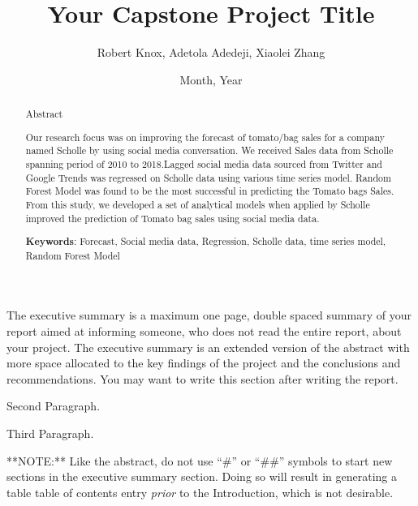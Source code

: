 \documentclass[12pt,oneside]{chicagocapstone}
\title{Your Capstone Project Title}
\author{Robert Knox, Adetola Adedeji, Xiaolei Zhang}
\date{Month, Year} %
\begin{document}
  \maketitle

\frontmatter %
\pagestyle{empty} %


  \begin{abstract}
    Abstract
    
    Our research focus was on improving the forecast of tomato/bag sales for
    a company named Scholle by using social media conversation. We received
    Sales data from Scholle spanning period of 2010 to 2018.Lagged social
    media data sourced from Twitter and Google Trends was regressed on
    Scholle data using various time series model. Random Forest Model was
    found to be the most successful in predicting the Tomato bags Sales.
    From this study, we developed a set of analytical models when applied by
    Scholle improved the prediction of Tomato bag sales using social media
    data.
    
    \bigskip  \bigskip
    \bigskip
    
    \textbf{Keywords}: Forecast, Social media data, Regression, Scholle
    data, time series model, Random Forest Model
    
    \bigskip  \bigskip
    \bigskip
  \end{abstract}
  \begin{executive}
    The executive summary is a maximum one page, double spaced summary of
    your report aimed at informing someone, who does not read the entire
    report, about your project. The executive summary is an extended version
    of the abstract with more space allocated to the key findings of the
    project and the conclusions and recommendations. You may want to write
    this section after writing the report.
    
    Second Paragraph.
    
    Third Paragraph.
    
    \bigskip
    \bigskip
    \bigskip
    **NOTE:** Like the abstract, do not use ``\#'' or ``\#\#'' symbols to
    start new sections in the executive summary section. Doing so will
    result in generating a table table of contents entry \emph{prior} to the
    Introduction, which is not desirable.
  \end{executive}
\end{document}
